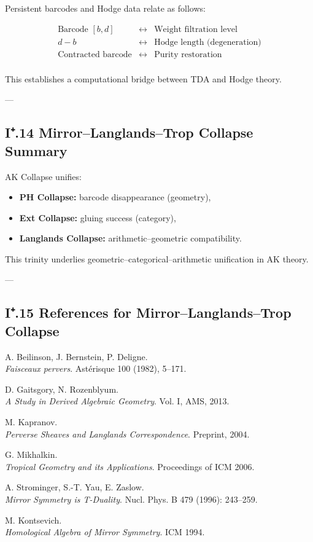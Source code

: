 \documentclass[11pt]{article}
\begin{document}
Persistent barcodes and Hodge data relate as follows:

\[
\begin{array}{ccc}
\text{Barcode } [b,d] & \leftrightarrow & \text{Weight filtration level} \\
d - b & \leftrightarrow & \text{Hodge length (degeneration)} \\
\text{Contracted barcode} & \leftrightarrow & \text{Purity restoration} \\
\end{array}
\]

This establishes a computational bridge between TDA and Hodge theory.

---

\subsection*{I⁺.14 Mirror–Langlands–Trop Collapse Summary}

AK Collapse unifies:

\begin{itemize}
  \item \textbf{PH Collapse:} barcode disappearance (geometry),
  \item \textbf{Ext Collapse:} gluing success (category),
  \item \textbf{Langlands Collapse:} arithmetic–geometric compatibility.
\end{itemize}

This trinity underlies geometric–categorical–arithmetic unification in AK theory.

---

\subsection*{I⁺.15 References for Mirror–Langlands–Trop Collapse}

\begin{thebibliography}{9}

A. Beilinson, J. Bernstein, P. Deligne.\\
\textit{Faisceaux pervers}. Astérisque 100 (1982), 5–171.

D. Gaitsgory, N. Rozenblyum.\\
\textit{A Study in Derived Algebraic Geometry}.  
Vol. I, AMS, 2013.

M. Kapranov.\\
\textit{Perverse Sheaves and Langlands Correspondence}.  
Preprint, 2004.

G. Mikhalkin.\\
\textit{Tropical Geometry and its Applications}.  
Proceedings of ICM 2006.

A. Strominger, S.-T. Yau, E. Zaslow.\\
\textit{Mirror Symmetry is T-Duality}.  
Nucl. Phys. B 479 (1996): 243–259.

M. Kontsevich.\\
\textit{Homological Algebra of Mirror Symmetry}.  
ICM 1994.

\end{thebibliography}
\end{document}
